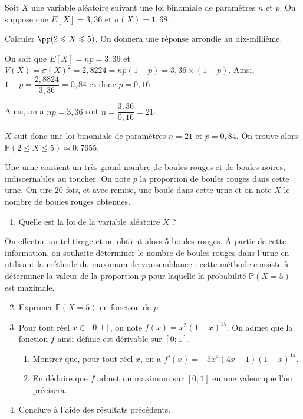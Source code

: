 \documentclass[11pt,fleqn, openany]{book} %
\begin{document}
\begin{exercise}[topic=prob12]
Soit $X$ une variable aléatoire suivant une loi binomiale de paramètres $n$ et $p$. On suppose que $E[X]=3,36$ et $\sigma(X)=1,68$.

Calculer $\pp (2\leqslant X \leqslant 5)$. On donnera une réponse arrondie au dix-millième.
\end{exercise}

\begin{solution}
On sait que $E[X]=np=3,36$ et $V(X)=\sigma(X)^2=2,8224=np(1-p)=3,36 \times(1-p)$. Ainsi, $1-p=\dfrac{2,8824}{3,36}=0,84$ et donc $p=0,16$.

Ainsi, on a $np=3,36$ soit $n=\dfrac{3,36}{0,16}=21$.

$X$ suit donc une loi binomiale de paramètres $n=21$ et $p=0,84$. On trouve alors $\mathbb{P}(2\leqslant X \leqslant 5) \simeq 0,7655$.
\end{solution}


\begin{exercise}[topic=prob12]
Une urne contient un très grand nombre de boules rouges et de boules noires, indiscernables au toucher. On note $p$ la proportion de boules rouges dans cette urne. On tire 20 fois, et avec remise, une boule dans cette urne et on note $X$ le nombre de boules rouges obtenues.

\begin{enumerate}
\item Quelle est la loi de la variable aléatoire $X$ ?
\end{enumerate}
On effectue un tel tirage et on obtient alors 5 boules rouges. À partir de cette information, on souhaite déterminer le nombre de boules rouges dans l'urne en utilisant la méthode du maximum de vraisemblance : cette méthode consiste à déterminer la valeur de la proportion $p$ pour laquelle la probabilité $\mathbb{P}(X=5)$ est maximale.

\begin{enumerate}
\setcounter{enumi}{1}
\item Exprimer $\mathbb{P}(X=5)$ en fonction de $p$.

\item Pour tout réel $x\in[0;1]$, on note $f(x)=x^5(1-x)^{15}$. On admet que la fonction $f$ ainsi définie est dérivable sur $[0;1]$.
\begin{enumerate}
\item  Montrer que, pour tout réel $x$, on a $f'(x)=-5x^4(4x-1)(1-x)^{14}$.     
\item En déduire que $f$ admet un maximum sur $[0;1]$ en une valeur que l'on précisera.
\end{enumerate}
\item Conclure à l'aide des résultats précédents.
\end{enumerate}
\newpage
\end{exercise}
\end{document}
